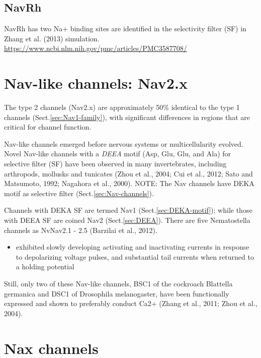 \subsection{NavRh}

NavRh has two Na+ binding sites are identified in the selectivity filter (SF) in
Zhang et al. (2013) simulation.
\url{https://www.ncbi.nlm.nih.gov/pmc/articles/PMC3587708/}



\section{Nav-like channels: Nav2.x}
\label{sec:Nav-like-channels}    
\label{sec:Nav2-family}    

The type 2 channels (Nav2.x) are approximately 50\% identical to the type 1
channels (Sect.\ref{sec:Nav1-family}), with significant differences in
regions that are critical for channel function.

Nav-like channels emerged before nervous systems or multicellularity evolved.
Novel Nav-like channels with a {\it DEEA} motif (Asp, Glu, Glu, and Ala)  for
selective filter (SF) have been observed in many invertebrates, including
arthropods, mollusks and tunicates (Zhou et al., 2004; Cui et al., 2012; Sato
and Matsumoto, 1992; Nagahora et al., 2000). NOTE: The Nav channels have DEKA
motif as selective filter (Sect.\ref{sec:Nav-channels}).

Channels with DEKA SF are termed Nav1 (Sect.\ref{sec:DEKA-motif}); while those
with DEEA SF are coined Nav2 (Sect.\ref{sec:DEEA}).
There are five Nematostella channels as NvNav2.1 - 2.5 (Barzilai et al., 2012).
\begin{itemize}
  
  \item  exhibited slowly developing activating and inactivating currents in
  response to depolarizing voltage pulses, and substantial tail currents when
  returned to a holding potential
  
  
  
\end{itemize}

Still, only two of these Nav-like channels, BSC1 of the cockroach Blattella
germanica and DSC1 of Drosophila melanogaster, have been functionally expressed
and shown to preferably conduct Ca2+ (Zhang et al., 2011; Zhou et al., 2004).

\section{Nax channels}
\label{sec:Nax-channels}

